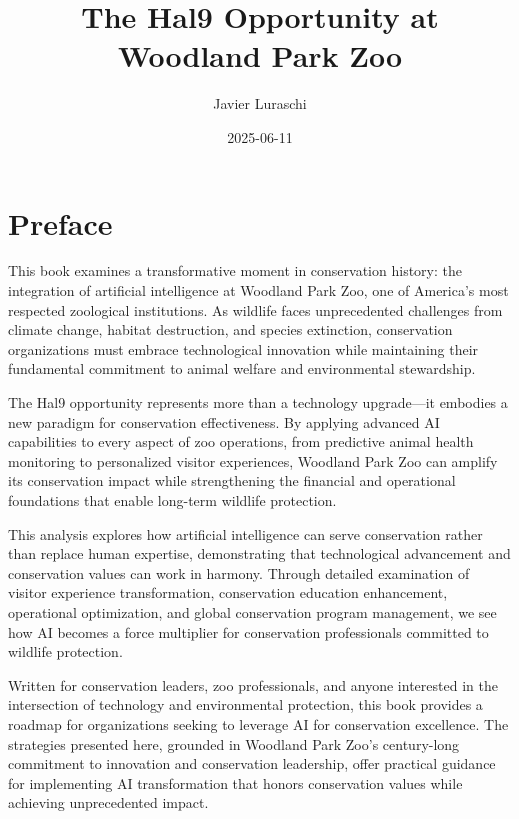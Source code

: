 \documentclass[
  Letterpaper,
]{scrbook}
\title{The Hal9 Opportunity at Woodland Park Zoo}
\author{Javier Luraschi}
\date{2025-06-11}
\renewcommand*\contentsname{Table of contents}
\newcommand\contentsname{Table of contents}
\begin{document}
\frontmatter
\maketitle

\renewcommand*\contentsname{Table of contents}
{
\setcounter{tocdepth}{1}
\tableofcontents
}

\mainmatter
{}

\chapter*{Preface}\label{preface}


This book examines a transformative moment in conservation history: the
integration of artificial intelligence at Woodland Park Zoo, one of
America's most respected zoological institutions. As wildlife faces
unprecedented challenges from climate change, habitat destruction, and
species extinction, conservation organizations must embrace
technological innovation while maintaining their fundamental commitment
to animal welfare and environmental stewardship.

The Hal9 opportunity represents more than a technology upgrade---it
embodies a new paradigm for conservation effectiveness. By applying
advanced AI capabilities to every aspect of zoo operations, from
predictive animal health monitoring to personalized visitor experiences,
Woodland Park Zoo can amplify its conservation impact while
strengthening the financial and operational foundations that enable
long-term wildlife protection.

This analysis explores how artificial intelligence can serve
conservation rather than replace human expertise, demonstrating that
technological advancement and conservation values can work in harmony.
Through detailed examination of visitor experience transformation,
conservation education enhancement, operational optimization, and global
conservation program management, we see how AI becomes a force
multiplier for conservation professionals committed to wildlife
protection.

Written for conservation leaders, zoo professionals, and anyone
interested in the intersection of technology and environmental
protection, this book provides a roadmap for organizations seeking to
leverage AI for conservation excellence. The strategies presented here,
grounded in Woodland Park Zoo's century-long commitment to innovation
and conservation leadership, offer practical guidance for implementing
AI transformation that honors conservation values while achieving
unprecedented impact.
\end{document}
